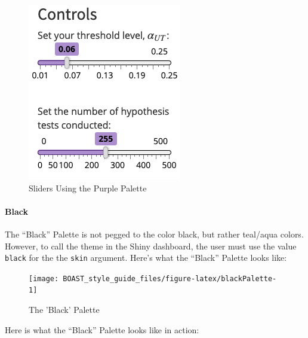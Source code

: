 \documentclass[
]{book}
\begin{document}
\begin{figure}

{\centering \includegraphics{images/purpleSliders} 

}

\caption{Sliders Using the Purple Palette}\label{fig:purpleAction3}
\end{figure}

\hypertarget{black}{%
\paragraph{Black}\label{black}}

The ``Black'' Palette is not pegged to the color black, but rather teal/aqua colors. However, to call the theme in the Shiny dashboard, the user must use the value \texttt{black} for the the \texttt{skin} argument. Here's what the ``Black'' Palette looks like:

\begin{figure}

{\centering \texttt{[image: BOAST\_style\_guide\_files/figure-latex/blackPalette-1]} 

}

\caption{The 'Black' Palette}\label{fig:blackPalette}
\end{figure}

Here is what the ``Black'' Palette looks like in action:
\end{document}
